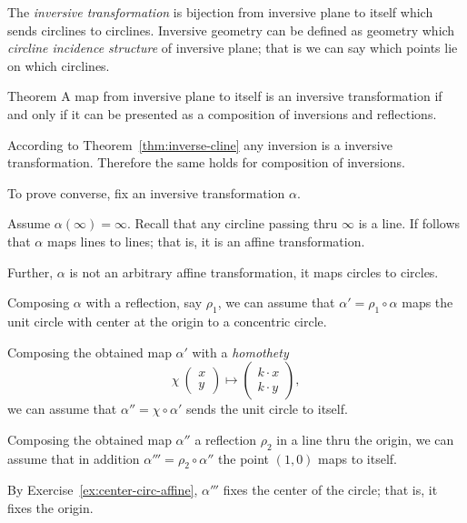 The \emph{inversive transformation} is bijection from inversive plane to itself which sends circlines to circlines.
Inversive geometry can be defined as geometry which  {}\emph{circline incidence structure} of inversive plane;
that is we can say which points lie on which circlines.

\begin{thm}{Theorem}\label{thm:inversions-inversive}
A map from inversive plane to itself is an inversive transformation
if and only if it can be presented as a composition of inversions and reflections.  
\end{thm}

According to Theorem~\ref{thm:inverse-cline} any inversion is a inversive transformation.
Therefore the same holds for composition of inversions.

To prove converse, 
fix an inversive transformation $\alpha$.

Assume $\alpha(\infty)=\infty$.
Recall that any circline passing thru $\infty$ is a line.
If follows that $\alpha$ maps lines to lines;
that is,
it is an affine transformation.

Further, $\alpha$ is not an arbitrary affine transformation,
it maps circles to circles.

Composing $\alpha$ with a reflection, say $\rho_1$, we can assume that $\alpha'=\rho_1\circ\alpha$ maps the unit circle with center at the origin to a concentric circle. 

Composing the obtained map $\alpha'$ with a {}\emph{homothety} 
\[\chi\:\left(\begin{smallmatrix}
x\\ y
\end{smallmatrix} \right)\mapsto \left(\begin{smallmatrix}
k\cdot x\\ k\cdot y
\end{smallmatrix} \right),\]
we can assume that $\alpha''=\chi\circ\alpha'$ sends the unit circle to itself.


Composing the obtained map $\alpha''$
 a reflection $\rho_2$ in a line thru the origin,
we can assume that in addition $\alpha'''=\rho_2\circ\alpha''$ the point $(1,0)$ maps to itself.

By Exercise~\ref{ex:center-circ-affine},
$\alpha'''$ fixes the center of the circle;
that is, it fixes the origin.

